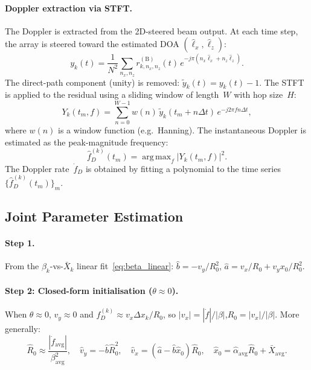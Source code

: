\documentclass[11pt,a4paper]{article}
\DeclareMathOperator*{\argmax}{arg\,max}
\begin{document}
\paragraph{Doppler extraction via STFT.}
The Doppler is extracted from the 2D-steered beam output.  At each
time step, the array is steered toward the estimated DOA
$(\hat{\ell}_x,\hat{\ell}_z)$:
\begin{equation}
  y_k(t)=\frac{1}{N^2}\sum_{n_x,n_z}
  r_{k,n_x,n_z}^{(\mathrm{B})}(t)\,
  e^{-j\pi(n_x\hat{\ell}_x+n_z\hat{\ell}_z)}.
  \label{eq:steered}
\end{equation}
The direct-path component (unity) is removed:
$\tilde{y}_k(t)=y_k(t)-1$.  The STFT is applied to the residual
using a sliding window of length~$W$ with hop size~$H$:
\begin{equation}
  Y_k(t_m,f) = \sum_{n=0}^{W-1} w(n)\,\tilde{y}_k(t_m+n\Delta t)\,
  e^{-j2\pi f n\Delta t},
  \label{eq:stft}
\end{equation}
where $w(n)$ is a window function (e.g.\ Hanning).  The
instantaneous Doppler is estimated as the peak-magnitude frequency:
\begin{equation}
  \hat{f}_D^{(k)}(t_m) = \argmax_f \bigl|Y_k(t_m,f)\bigr|^2.
  \label{eq:doppler_est}
\end{equation}
The Doppler rate~$\dot{f}_D$ is obtained by fitting a polynomial
to the time series $\{\hat{f}_D^{(k)}(t_m)\}_{m}$.

\subsection{Joint Parameter Estimation}
\label{sec:joint_b}

\paragraph{Step 1.}
From the $\beta_k$-vs-$\bar{X}_k$ linear
fit~\eqref{eq:beta_linear}:
$\hat{b}=-v_y/R_0^2$, $\hat{a}=v_x/R_0+v_yx_0/R_0^2$.

\paragraph{Step 2: Closed-form initialisation ($\theta\approx 0$).}
When $\theta\approx 0$, $v_y\approx 0$ and
$f_D^{(k)}\approx v_x\Delta x_k/R_0$, so
$|v_x|=|\dot{f}|/|\beta|$,\;$R_0=|v_x|/|\beta|$.
More generally:
\begin{equation}
  \hat{R}_0\approx
  \frac{|\dot{f}_{\mathrm{avg}}|}{\beta_{\mathrm{avg}}^2},
  \quad
  \hat{v}_y=-\hat{b}\hat{R}_0^2,
  \quad
  \hat{v}_x=(\hat{a}-\hat{b}\hat{x}_0)\hat{R}_0,
  \quad
  \hat{x}_0=\hat{\alpha}_{\mathrm{avg}}\hat{R}_0
  +\bar{X}_{\mathrm{avg}}.
  \label{eq:init_params}
\end{equation}
\end{document}
